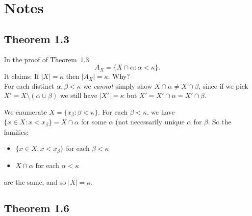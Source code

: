 
\section{Notes}

\subsection{Theorem 1.3}

In the proof of Theorem~1.3
\begin{equation*}
  A_X = \{X\cap \alpha: \alpha<\kappa\}.
\end{equation*}
It claims: If \(|X|=\kappa\) then \(|A_X|=\kappa\). Why?\\
For each distinct \(\alpha,\beta < \kappa\)
we \emph{cannot} simply show \(X\cap \alpha \neq X\cap\beta\), since
if we pick \(X' = X \setminus (\alpha \cup \beta)\)
we still have \(|X'|=\kappa\) but
\(X' = X'\cap \alpha = X' \cap \beta\).

We enumerate \(X=\{x_\beta: \beta < \kappa\}\).
For each \(\beta < \kappa\), we have \(\{x\in X: x< x_\beta\} = X\cap \alpha\)
for some \(\alpha\) (not necessarily unique \(\alpha\) for \(\beta\).
So the families:
\begin{itemize}
\item \(\{x\in X: x< x_\beta\}\) for each \(\beta < \kappa\)
\item \(X\cap \alpha\) for each \(\alpha < \kappa\)
\end{itemize}
are the same, and so \(|X|=\kappa\).

\subsection{Theorem 1.6}

